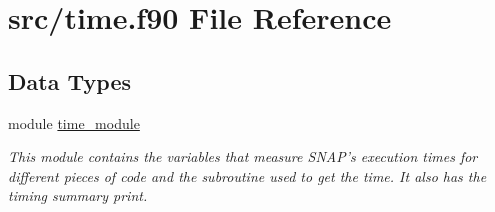 \hypertarget{time_8f90}{\section{src/time.f90 File Reference}
\label{time_8f90}
}
\subsection*{Data Types}
\begin{DoxyCompactItemize}
\item 
module \hyperlink{classtime__module}{time\-\_\-module}
\begin{DoxyCompactList}\small\item\em This module contains the variables that measure S\-N\-A\-P's execution times for different pieces of code and the subroutine used to get the time. It also has the timing summary print. \end{DoxyCompactList}\end{DoxyCompactItemize}

